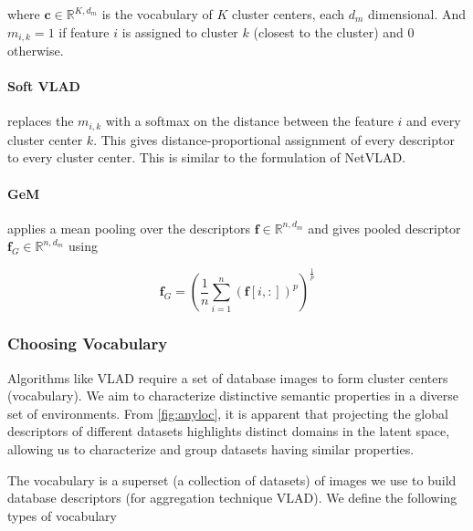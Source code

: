 where $\mathbf{c} \in \mathbb{R}^{K, d_m}$ is the vocabulary of $K$
cluster centers, each $d_m$ dimensional. And $m_{i, k} = 1$ if feature
$i$ is assigned to cluster $k$ (closest to the cluster) and 0
otherwise.

\paragraph{Soft VLAD} replaces the $m_{i, k}$ with a softmax on the
distance between the feature $i$ and every cluster center $k$. This
gives distance-proportional assignment of every descriptor to every
cluster center. This is similar to the formulation of NetVLAD.

\paragraph{GeM} applies a mean pooling over the descriptors
$\mathbf{f} \in \mathbb{R}^{n, d_m}$ and gives pooled descriptor
$\mathbf{f}_G \in \mathbb{R}^{n, d_m}$ using

\begin{equation}
    \mathbf{f}_G = \left(\frac{1}{n} \sum_{i=1}^{n} \left(
            \mathbf{f}[i,:]\right)^p \right)^{\frac{1}{p}}
\end{equation}

\subsubsection{Choosing Vocabulary}

Algorithms like VLAD require a set of database images to form cluster
centers (vocabulary). We aim to characterize distinctive semantic
properties in a diverse set of environments. From \cref{fig:anyloc},
it is apparent that projecting the global descriptors of different
datasets highlights distinct domains in the latent space, allowing
us to characterize and group datasets having similar properties. 

The vocabulary is a superset (a collection of datasets) of images we
use to build database descriptors (for aggregation technique VLAD). We 
define the following types of vocabulary

